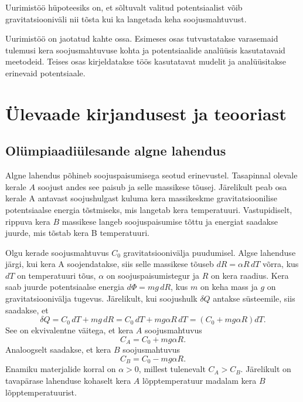 \documentclass{trkut}%
\begin{document}
Uurimistöö hüpoteesiks on, et sõltuvalt valitud potentsiaalist võib gravitatsiooniväli nii tõsta kui ka langetada keha soojusmahtuvust.

Uurimistöö on jaotatud kahte ossa.
Esimeses osas tutvustatakse varasemaid tulemusi kera soojusmahtuvuse kohta ja potentsiaalide analüüsis kasutatavaid meetodeid.
Teises osas kirjeldatakse töös kasutatavat mudelit ja analüüsitakse erinevaid potentsiaale.



\chapter{Ülevaade kirjandusest ja teooriast}

\section{Olümpiaadiülesande algne lahendus} \label{algne}

Algne lahendus põhineb soojuspaisumisega seotud erinevustel. Tasapinnal olevale kerale $A$ soojust andes see paisub ja selle massikese tõusej. Järelikult peab osa kerale A antavast soojushulgast kuluma kera massikeskme gravitatsioonilise potentsiaalse energia tõstmiseks, mis langetab kera temperatuuri. Vastupidiselt, rippuva kera $B$ massikese langeb soojuspaisumise tõttu ja energiat saadakse juurde, mis tõstab kera B temperatuuri. \parencite[6-7]{ipho67}

Olgu kerade soojusmahtuvus $C_0$ gravitatsioonivälja puudumisel. Algse lahenduse järgi, kui kera A soojendatakse, siis selle massikese tõuseb $dR=\alpha R \, dT$ võrra, kus $dT$ on temperatuuri tõus, $\alpha$ on soojuspaisumistegur ja $R$ on kera raadius. Kera saab juurde potentsiaalse energia $d\Phi = mg \, dR$, kus $m$ on keha mass ja $g$ on gravitatsioonivälja tugevus. Järelikult, kui soojushulk \(\delta Q\) antakse süsteemile, siis saadakse, et \parencite[2-3]{palma15}
\begin{equation}
    \delta Q = C_0 \, dT + mg \, dR = C_0 \, dT + mg\alpha R \, dT = (C_0 +  mg\alpha R) dT.
\end{equation}
See on ekvivalentne väitega, et kera \(A\) soojusmahtuvus
\begin{equation}
    C_A = C_0 + mg\alpha R.
\end{equation}
Analoogselt saadakse, et kera \(B\) soojusmahtuvus
\begin{equation}
    C_B = C_0 - mg\alpha R.
\end{equation}
Enamiku materjalide korral on \(\alpha > 0\), millest tulenevalt \(C_A>C_B\). Järelikult on tavapärase lahenduse kohaselt kera \(A\) lõpptemperatuur madalam kera \(B\) lõpptemperatuurist.
\end{document}

